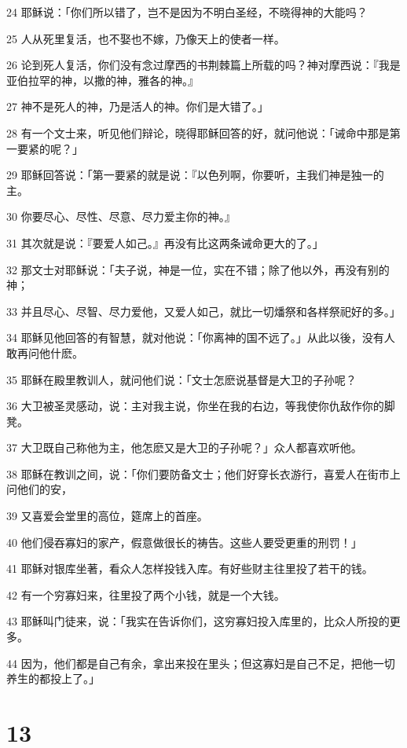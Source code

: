 \par 24 耶稣说：「你们所以错了，岂不是因为不明白圣经，不晓得神的大能吗？
\par 25 人从死里复活，也不娶也不嫁，乃像天上的使者一样。
\par 26 论到死人复活，你们没有念过摩西的书荆棘篇上所载的吗？神对摩西说：『我是亚伯拉罕的神，以撒的神，雅各的神。』
\par 27 神不是死人的神，乃是活人的神。你们是大错了。」
\par 28 有一个文士来，听见他们辩论，晓得耶稣回答的好，就问他说：「诫命中那是第一要紧的呢？」
\par 29 耶稣回答说：「第一要紧的就是说：『以色列啊，你要听，主我们神是独一的主。
\par 30 你要尽心、尽性、尽意、尽力爱主你的神。』
\par 31 其次就是说：『要爱人如己。』再没有比这两条诫命更大的了。」
\par 32 那文士对耶稣说：「夫子说，神是一位，实在不错；除了他以外，再没有别的神；
\par 33 并且尽心、尽智、尽力爱他，又爱人如己，就比一切燔祭和各样祭祀好的多。」
\par 34 耶稣见他回答的有智慧，就对他说：「你离神的国不远了。」从此以後，没有人敢再问他什麽。
\par 35 耶稣在殿里教训人，就问他们说：「文士怎麽说基督是大卫的子孙呢？
\par 36 大卫被圣灵感动，说：主对我主说，你坐在我的右边，等我使你仇敌作你的脚凳。
\par 37 大卫既自己称他为主，他怎麽又是大卫的子孙呢？」众人都喜欢听他。
\par 38 耶稣在教训之间，说：「你们要防备文士；他们好穿长衣游行，喜爱人在街市上问他们的安，
\par 39 又喜爱会堂里的高位，筵席上的首座。
\par 40 他们侵吞寡妇的家产，假意做很长的祷告。这些人要受更重的刑罚！」
\par 41 耶稣对银库坐著，看众人怎样投钱入库。有好些财主往里投了若干的钱。
\par 42 有一个穷寡妇来，往里投了两个小钱，就是一个大钱。
\par 43 耶稣叫门徒来，说：「我实在告诉你们，这穷寡妇投入库里的，比众人所投的更多。
\par 44 因为，他们都是自己有余，拿出来投在里头；但这寡妇是自己不足，把他一切养生的都投上了。」

\chapter{13}

